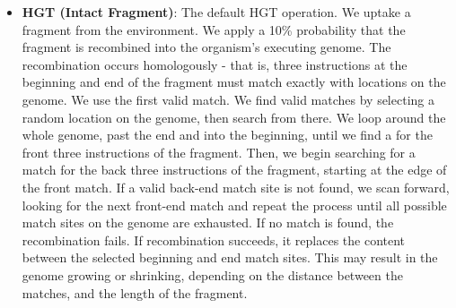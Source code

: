 \documentclass[PhD]{msu-thesis}
\begin{document}
\begin{itemize}
	\item \textbf{HGT (Intact Fragment)}: The default HGT operation. We uptake a fragment from the environment. We apply a 10\% probability that the fragment is recombined into the organism's executing genome. The recombination occurs homologously - that is, three instructions at the beginning and end of the fragment must match exactly with locations on the genome. We use the first valid match. We find valid matches by selecting a random location on the genome, then search from there. We loop around the whole genome, past the end and into the beginning, until we find a for the front three instructions of the fragment. Then, we begin searching for a match for the back three instructions of the fragment, starting at the edge of the front match. If a valid back-end match site is not found, we scan forward, looking for the next front-end match and repeat the process until all possible match sites on the genome are exhausted.
If no match is found, the recombination fails. If recombination succeeds, it replaces the content between the selected beginning and end match sites. This may result in the genome growing or shrinking, depending on the distance between the matches, and the length of the fragment.
	

\end{itemize}
\end{document}
